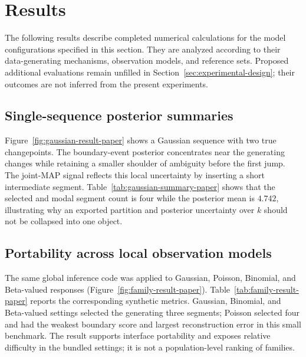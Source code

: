 \section{Results}
\label{sec:results}

The following results describe completed numerical calculations for the model configurations specified in this section.
They are analyzed according to their data-generating mechanisms, observation
models, and reference sets. Proposed additional evaluations remain unfilled in
Section~\ref{sec:experimental-design}; their outcomes are not inferred from
the present experiments.

\FloatBarrier
\subsection{Single-sequence posterior summaries}
Figure~\ref{fig:gaussian-result-paper} shows a Gaussian sequence with two true changepoints. The boundary-event posterior concentrates near the generating changes while retaining a smaller shoulder of ambiguity before the first jump. The joint-MAP signal reflects this local uncertainty by inserting a short intermediate segment. Table~\ref{tab:gaussian-summary-paper} shows that the selected and modal segment count is four while the posterior mean is $4.742$, illustrating why an exported partition and posterior uncertainty over $k$ should not be collapsed into one object.





\FloatBarrier
\subsection{Portability across local observation models}
The same global inference code was applied to Gaussian, Poisson, Binomial, and Beta-valued responses (Figure~\ref{fig:family-result-paper}). Table~\ref{tab:family-result-paper} reports the corresponding synthetic metrics. Gaussian, Binomial, and Beta-valued settings selected the generating three segments; Poisson selected four and had the weakest boundary score and largest reconstruction error in this small benchmark. The result supports interface portability and exposes relative difficulty in the bundled settings; it is not a population-level ranking of families.



